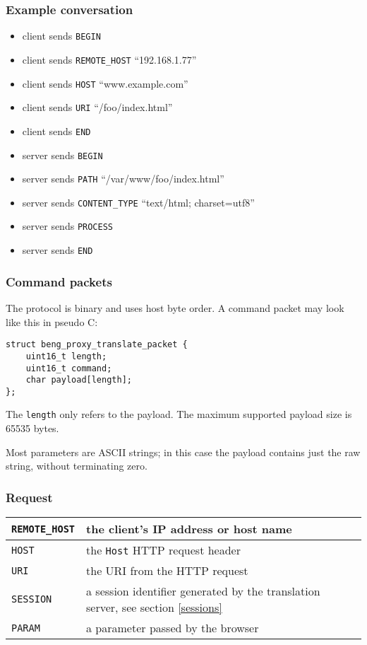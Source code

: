 \documentclass[a4paper,12pt]{article}
\begin{document}
\subsubsection{Example conversation}

\begin{itemize}
\item client sends \texttt{BEGIN}
\item client sends \texttt{REMOTE\_HOST} ``192.168.1.77''
\item client sends \texttt{HOST} ``www.example.com''
\item client sends \texttt{URI} ``/foo/index.html''
\item client sends \texttt{END}
\item server sends \texttt{BEGIN}
\item server sends \texttt{PATH} ``/var/www/foo/index.html''
\item server sends \texttt{CONTENT\_TYPE} ``text/html; charset=utf8''
\item server sends \texttt{PROCESS}
\item server sends \texttt{END}
\end{itemize}

\subsubsection{Command packets}

The protocol is binary and uses host byte order.  A command packet may
look like this in pseudo C:

\begin{verbatim}
struct beng_proxy_translate_packet {
    uint16_t length;
    uint16_t command;
    char payload[length];
};
\end{verbatim}

The \texttt{length} only refers to the payload.  The maximum supported
payload size is 65535 bytes.

Most parameters are ASCII strings; in this case the payload contains
just the raw string, without terminating zero.

\subsubsection{Request}

\begin{tabular}{|l|p{10cm}|}
\hline
\texttt{REMOTE\_HOST} & the client's IP address or host name \\
\hline
\texttt{HOST} & the \texttt{Host} HTTP request header \\
\hline
\texttt{URI} & the URI from the HTTP request \\
\hline
\texttt{SESSION} & a session identifier generated by the translation
server, see section \ref{sessions} \\
\hline
\texttt{PARAM} & a parameter passed by the browser \\
\hline
\end{tabular}
\end{document}
